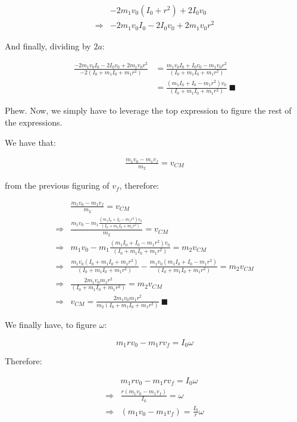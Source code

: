 \documentclass[letterpaper]{article}
\begin{document}
\begin{align}
   &-2m_1v_0(I_0+r^2) + 2{I_0}{v_0}\\
\Rightarrow &-2m_1v_0I_0- 2{I_0}{v_0}+2m_1v_0r^2 
\end{align}

And finally, dividing by \(2a\):

\begin{align}
   \frac{-2m_1v_0I_0- 2{I_0}{v_0}+2m_1v_0r^2}{-2(I_0+m_1I_0+m_1r^2)} &=\frac{m_1v_0I_0+{I_0}{v_0}-m_1v_0r^2}{(I_0+m_1I_0+m_1r^2)}\\
&= \frac{(m_1I_0+{I_0}-m_1r^2)v_0}{(I_0+m_1I_0+m_1r^2)}\ \blacksquare
\end{align}

Phew. Now, we simply have to leverage the top expression to figure the rest of the expressions.

We have that:

\begin{align}
\frac{m_1 v_0 -m_1v_f}{m_2} = v_{CM}
\end{align}

from the previous figuring of \(v_f\), therefore:

\begin{align}
&\frac{m_1 v_0 -m_1v_f}{m_2} = v_{CM}\\
\Rightarrow &\frac{m_1 v_0 -m_1\frac{(m_1I_0+{I_0}-m_1r^2)v_0}{(I_0+m_1I_0+m_1r^2)}}{m_2} = v_{CM} \\
\Rightarrow &m_1 v_0 -m_1\frac{(m_1I_0+{I_0}-m_1r^2)v_0}{(I_0+m_1I_0+m_1r^2)} = m_2v_{CM} \\
\Rightarrow &\frac{m_1 v_0(I_0+m_1I_0+m_1r^2)}{(I_0+m_1I_0+m_1r^2)} -\frac{m_1v_0(m_1I_0+{I_0}-m_1r^2)}{(I_0+m_1I_0+m_1r^2)} = m_2v_{CM} \\
\Rightarrow &\frac{2m_1 v_0m_1r^2}{(I_0+m_1I_0+m_1r^2)}  = m_2v_{CM} \\
\Rightarrow &v_{CM} = \frac{2m_1 v_0m_1r^2}{m_2(I_0+m_1I_0+m_1r^2)}\ \blacksquare
\end{align}

We finally have, to figure \(\omega\):

\begin{equation}
m_1 rv_0 - m_1rv_f = I_0 \omega
\end{equation}

Therefore:

\begin{align}
 &m_1 rv_0 - m_1rv_f = I_0 \omega   \\
\Rightarrow &\frac{r(m_1 v_0 - m_1v_f)}{I_0} = \omega\\
\Rightarrow &(m_1 v_0 - m_1v_f) = \frac{I_0}{r}\omega
\end{align}
\end{document}
